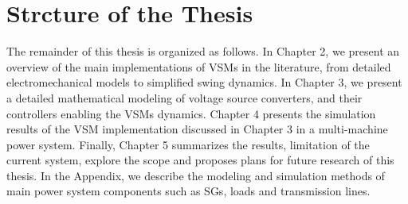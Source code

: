 \section{Strcture of the Thesis}
The remainder of this thesis is organized as follows. In Chapter 2, we present
an overview of the main implementations of VSMs in the literature, from detailed
electromechanical models to simplified swing dynamics. In Chapter 3, we present
a detailed mathematical modeling of voltage source converters, and their
controllers enabling the VSMs dynamics. Chapter 4 presents the simulation
results of the VSM implementation discussed in Chapter 3 in a multi-machine
power system. Finally, Chapter 5 summarizes the results, limitation of the
current system, explore the scope and proposes plans for future research of this
thesis. In the Appendix, we describe the modeling and simulation methods of main
power system components such as SGs, loads and transmission lines.